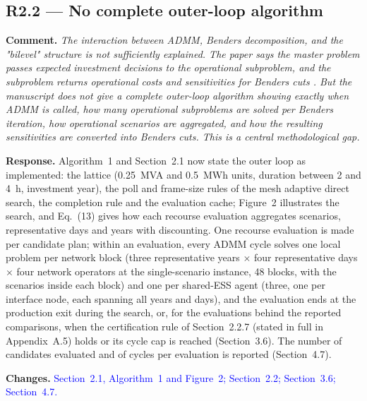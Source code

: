 \documentclass[11pt]{article}
\newcommand{\rcomment}[1]{\par\medskip\noindent\textbf{Comment.} \textit{#1}\par\smallskip}
\newcommand{\rresponse}[1]{\noindent\textbf{Response.} #1\par\smallskip}
\newcommand{\rchanges}[1]{\noindent\textbf{Changes.} \textcolor{blue}{#1}\par\medskip}
\begin{document}
\subsection*{R2.2 --- No complete outer-loop algorithm}
\rcomment{The interaction between ADMM, Benders decomposition, and the "bilevel" structure is not sufficiently explained. The paper says the master problem passes expected investment decisions to the operational subproblem, and the subproblem returns operational costs and sensitivities for Benders cuts . But the manuscript does not give a complete outer-loop algorithm showing exactly when ADMM is called, how many operational subproblems are solved per Benders iteration, how operational scenarios are aggregated, and how the resulting sensitivities are converted into Benders cuts. This is a central methodological gap.}
\rresponse{Algorithm~1 and Section~2.1 now state the outer loop as implemented: the lattice (0.25~MVA and 0.5~MWh units, duration between 2 and 4~h, investment year), the poll and frame-size rules of the mesh adaptive direct search, the completion rule and the evaluation cache; Figure~2 illustrates the search, and Eq.~(13) gives how each recourse evaluation aggregates scenarios, representative days and years with discounting. One recourse evaluation is made per candidate plan; within an evaluation, every ADMM cycle solves one local problem per network block (three representative years $\times$ four representative days $\times$ four network operators at the single-scenario instance, 48 blocks, with the scenarios inside each block) and one per shared-ESS agent (three, one per interface node, each spanning all years and days), and the evaluation ends at the production exit during the search, or, for the evaluations behind the reported comparisons, when the certification rule of Section~2.2.7 (stated in full in Appendix~A.5) holds or its cycle cap is reached (Section~3.6). The number of candidates evaluated and of cycles per evaluation is reported (Section~4.7).}
\rchanges{Section~2.1, Algorithm~1 and Figure~2; Section~2.2; Section~3.6; Section~4.7.}
\end{document}

